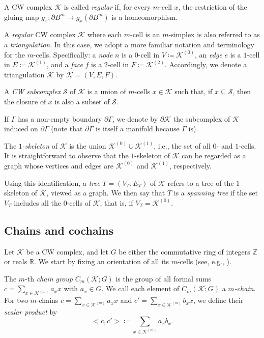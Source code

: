 \documentclass[a4paper,twoside,10pt]{article}
\theoremstyle{plain}
\theoremstyle{definition}
\theoremstyle{remark}
\newcommand{\mc}{\mathcal}
\newcommand{\R}{\mathbb{R}}
\newcommand{\Z}{\mathbb{Z}}
\newcommand{\K}{\mc{K}}
\newcommand{\inner}[2]{< #1,#2>}
\begin{document}
A CW complex $\K$ is called \emph{regular} if, for every $m$-cell $x$, the restriction of the gluing map $ g_x : \partial B^m \to g_x(\partial B^m) $ is a homeomorphism.

A \emph{regular} CW complex $\mc{K}$ where each $m$-cell is an $m$-simplex is also referred to as a \emph{triangulation}.
In this case, we adopt a more familiar notation and terminology for the $m$-cells.
Specifically: a \emph{node} $ n $ is a $0$-cell in $ V \coloneqq \mc{K}^{(0)} $, an \emph{edge} $ e $ is a $1$-cell in $ E \coloneqq \mc{K}^{(1)} $, and a \emph{face} $ f $ is a $2$-cell in $ F \coloneqq \mc{K}^{(2)} $.
Accordingly, we denote a triangulation $\mc{K}$ by $ \mc{K} = (V, E, F) $.

A \emph{CW subcomplex} $\mc{S}$ of $\mc{K}$ is a union of $m$-cells $ x \in \mc{K} $ such that, if $ x \subseteq \mc{S} $, then the closure of $ x $ is also a subset of $\mc{S}$.

If $\Gamma$ has a non-empty boundary $\partial \Gamma$, we denote by $\partial \mc{K}$ the subcomplex of $\mc{K}$ induced on $\partial \Gamma$ (note that $\partial \Gamma$ is itself a manifold because $\Gamma$ is).

The \emph{$1$-skeleton} of $\mc{K}$ is the union $\mc{K}^{(0)} \cup \mc{K}^{(1)}$, i.e., the set of all $0$- and $1$-cells.
It is straightforward to observe that the $1$-skeleton of $\mc{K}$ can be regarded as a graph whose vertices and edges are $\mc{K}^{(0)}$ and $\mc{K}^{(1)}$, respectively.

Using this identification, a \emph{tree} $T = (V_T, E_T)$ of $\mc{K}$ refers to a tree of the $1$-skeleton of $\mc{K}$, viewed as a graph.
We then say that $T$ is a \emph{spanning tree} if the set $V_T$ includes all the $0$-cells of $\mc{K}$, that is, if $V_T = \mc{K}^{(0)}$.
\subsection{Chains and cochains}
\label{sec:homology}

Let $\K$ be a CW complex, and let $G$ be either the commutative ring of integers $\Z$ or reals $\R$.
We start by fixing an orientation of all its $m$-cells (see, e.g., \cite[Chapter 2]{cooke2015homology}).

The $m$-th \emph{chain group} $C_m(\K;G)$ is the group of all formal sums $c = \sum_{x \in \K^{(m)}} a_x x$ with $a_x \in G$.
We call each element of $C_m(\K;G)$ a \emph{$m$-chain}.
For two $m$-chains $c=\sum_{x \in \K^{(m)}} a_x x$ and $c' = \sum_{x \in \K^{(m)}} b_{x} x$, we define their \emph{scalar product} by
\[
    \inner{c}{c'} \coloneqq \sum_{x \in \K^{(m)}} a_x b_x.
\]
\end{document}
